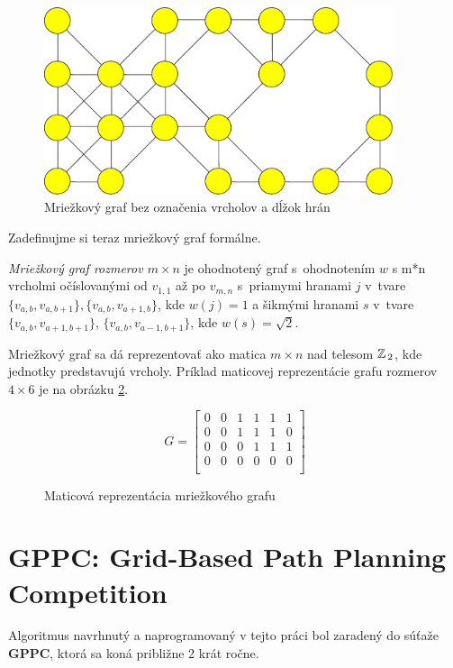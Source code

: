 \begin{figure}[h]
\centering
\includegraphics[height=5.5cm]{./img/mriezkovy_graf.eps}
\caption{Mriežkový graf bez označenia vrcholov a dĺžok hrán}
\label{fig:mriezkovy_graf}
\end{figure}


Zadefinujme si teraz mriežkový graf formálne.

\begin{define}
{\sl Mriežkový graf rozmerov $m \times n$} je ohodnotený graf s~ohodnotením $w$ s m*n vrcholmi očíslovanými od $v_{1,1}$ až po $v_{m,n}$ 
s~priamymi hranami $j$ v~tvare $\{v_{a,b}, v_{a,b+1}\}, \{v_{a,b}, v_{a+1,b}\}$, kde $w(j) = 1$ 
a šikmými hranami $ s $ v~tvare 
$\{v_{a,b}, v_{a+1,b+1}\}$, $\{v_{a,b}, v_{a-1,b+1}\}$, kde $ w(s) = \sqrt{2}$.
\end{define}

\begin{note}
	Mriežkový graf sa dá reprezentovať ako matica $m \times n$ nad telesom $\mathbb{Z}\,_2$, kde jednotky predstavujú vrcholy. Príklad maticovej reprezentácie grafu rozmerov $4 \times 6$ je na obrázku \ref{fig:maticova_reprezentacia}.
\end{note}



\begin{figure}[h]


\[
G =
  \begin{bmatrix}
    0 & 0 & 1 & 1 & 1 & 1\\
	0 & 0 & 1 & 1 & 1 & 0\\
	0 & 0 & 0 & 1 & 1 & 1\\
	0 & 0 & 0 & 0 & 0 & 0\\
  \end{bmatrix}
\]
\label{fig:maticova_reprezentacia}
\caption{Maticová reprezentácia mriežkového grafu}
\end{figure}




\section{GPPC: Grid-Based Path Planning Competition}
Algoritmus navrhnutý a naprogramovaný v tejto práci bol zaradený do súťaže \textbf{GPPC}, ktorá sa koná približne 2 krát ročne.

